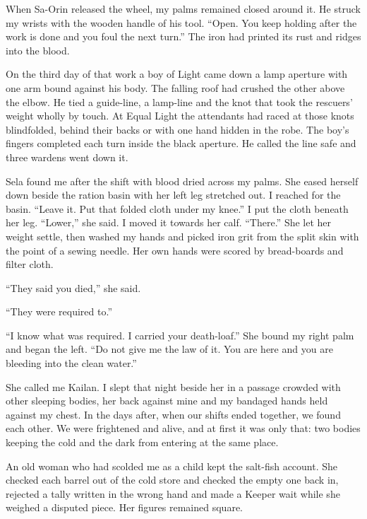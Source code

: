 When Sa-Orin released the wheel, my palms remained closed around it. He struck my wrists with the wooden handle of his tool. ``Open. You keep holding after the work is done and you foul the next turn.'' The iron had printed its rust and ridges into the blood.\par

On the third day of that work a boy of Light came down a lamp aperture with one arm bound against his body. The falling roof had crushed the other above the elbow. He tied a guide-line, a lamp-line and the knot that took the rescuers' weight wholly by touch. At Equal Light the attendants had raced at those knots blindfolded, behind their backs or with one hand hidden in the robe. The boy's fingers completed each turn inside the black aperture. He called the line safe and three wardens went down it.\par

Sela found me after the shift with blood dried across my palms. She eased herself down beside the ration basin with her left leg stretched out. I reached for the basin. ``Leave it. Put that folded cloth under my knee.'' I put the cloth beneath her leg. ``Lower,'' she said. I moved it towards her calf. ``There.'' She let her weight settle, then washed my hands and picked iron grit from the split skin with the point of a sewing needle. Her own hands were scored by bread-boards and filter cloth.\par

``They said you died,'' she said.\par

``They were required to.''\par

``I know what was required. I carried your death-loaf.'' She bound my right palm and began the left. ``Do not give me the law of it. You are here and you are bleeding into the clean water.''\par

She called me Kailan. I slept that night beside her in a passage crowded with other sleeping bodies, her back against mine and my bandaged hands held against my chest. In the days after, when our shifts ended together, we found each other. We were frightened and alive, and at first it was only that: two bodies keeping the cold and the dark from entering at the same place.\par

An old woman who had scolded me as a child kept the salt-fish account. She checked each barrel out of the cold store and checked the empty one back in, rejected a tally written in the wrong hand and made a Keeper wait while she weighed a disputed piece. Her figures remained square.\par

